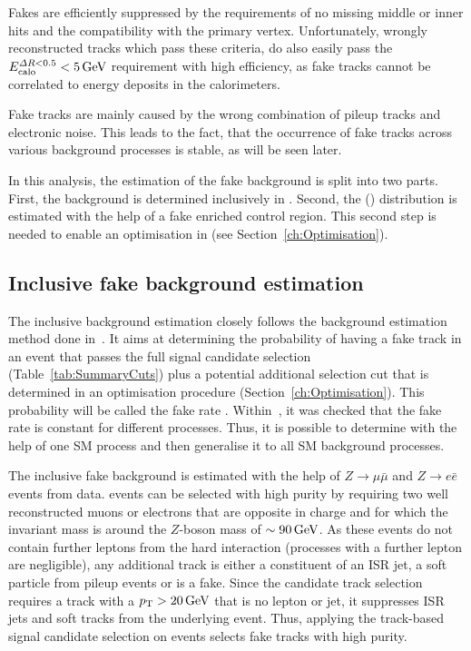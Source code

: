 Fakes are efficiently suppressed by the requirements of no missing middle or inner hits and the compatibility with the primary vertex.
Unfortunately, wrongly reconstructed tracks which pass these criteria, do also easily pass the $E^{\Delta R<0.5}_{\text{calo}}<5\,\text{Ge}\kern-0.06667em\text{V}$ requirement with high efficiency, as fake tracks cannot be correlated to energy deposits in the calorimeters. 

Fake tracks are mainly caused by the wrong combination of pileup tracks and electronic noise.
This leads to the fact, that the occurrence of fake tracks across various background processes is stable, as will be seen later.

In this analysis, the estimation of the fake background is split into two parts.
First, the background is determined inclusively in \dedx.
Second, the \dedx (\ias) distribution is estimated with the help of a fake enriched control region. 
This second step is needed to enable an optimisation in \dedx (see Section~\ref{ch:Optimisation}).


\subsection{Inclusive fake background estimation}
The inclusive background estimation closely follows the background estimation method done in~\cite{bib:CMS:DT_Thesis,bib:CMS:DT_8TeV_AN}.
It aims at determining the probability of having a fake track in an event that passes the full signal candidate selection (Table~\ref{tab:SummaryCuts}) plus a potential additional \pt selection cut that is determined in an
optimisation procedure (Section~\ref{ch:Optimisation}).
This probability will be called the fake rate \fakerate.
Within~\cite{bib:CMS:DT_Thesis,bib:CMS:DT_8TeV_AN}, it was checked that the fake rate is constant for different processes. 
Thus, it is possible to determine \fakerate with the help of one SM process and then generalise it to all SM background processes.


The inclusive fake background is estimated with the help of $Z\rightarrow\mu\bar{\mu}$ and $Z\rightarrow e\bar{e}$ events from data.
\Zlep events can be selected with high purity by requiring two well reconstructed muons or electrons that are opposite in charge and for which the invariant mass is around the $Z$-boson mass of $\sim90\,\text{Ge}\kern-0.06667em\text{V}$.
As these events do not contain further leptons from the hard interaction (processes with a further lepton are negligible), any additional track is either a constituent of an ISR jet, a soft particle from pileup events or is a fake. %
Since the candidate track selection requires a track with a $p_{\text{T}}>20\,\text{Ge}\kern-0.06667em\text{V}$ that is no lepton or jet, it suppresses ISR jets and soft tracks from the underlying event.
Thus, applying the track-based signal candidate selection on \Zlep events selects fake tracks with high purity.

